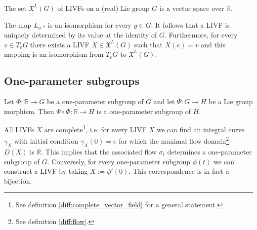     \begin{property}
        The set $\mathfrak{X}^L(G)$ of LIVFs on a (real) Lie group $G$ is a vector space over $\mathbb{R}$.
    \end{property}
    \begin{property}\label{lie:livf_prop}
        The map $L_{g,\ast}$ is an isomorphism for every $g\in G$. It follows that a LIVF is uniquely determined by its value at the identity of $G$. Furthermore, for every $v\in T_eG$ there exists a LIVF $X\in\mathfrak{X}^L(G)$ such that $X(e)=v$ and this mapping is an isomorphism from $T_eG$ to $\mathfrak{X}^L(G)$.
    \end{property}

\subsection{One-parameter subgroups}

    \begin{property}\label{group:OPS_composition}
        Let $\Phi:\mathbb{R}\rightarrow G$ be a one-parameter subgroup of $G$ and let $\Psi:G\rightarrow H$ be a Lie group morphism. Then $\Psi\circ\Phi:\mathbb{R}\rightarrow H$ is a one-parameter subgroup of $H$.
    \end{property}

    \begin{property}\label{lie:livf_subgroup}
        All LIVFs $X$ are complete\footnote{See definition \ref{diff:complete_vector_field} for a general statement.}, i.e. for every LIVF $X$ we can find an integral curve $\gamma_X$ with initial condition $\gamma_X(0) = e$ for which the maximal flow domain\footnote{See definition \ref{diff:flow}.} $D(X)$ is $\mathbb{R}$. This implies that the associated flow $\sigma_t$ determines a one-parameter subgroup of $G$. Conversely, for every one-parameter subgroup $\phi(t)$ we can construct a LIVF by taking $X := \phi'(0)$. This correspondence is in fact a bijection.
    \end{property}

